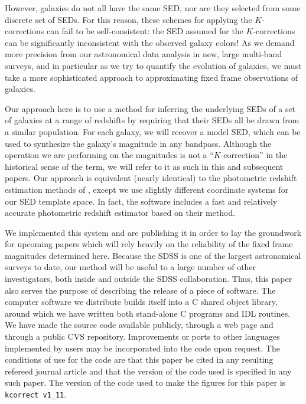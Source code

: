 \documentclass[10pt,preprint]{aastex}
\newcommand{\kversion}{{\tt v1\_11}}
\begin{document}
However, galaxies do not all have the same SED, nor are they selected
from some discrete set of SEDs. For this reason, these schemes for
applying the $K$-corrections can fail to be self-consistent: the SED
assumed for the $K$-corrections can be significantly inconsistent with
the observed galaxy colors! As we demand more precision from our
astronomical data analysis in new, large multi-band surveys, and in
particular as we try to quantify the evolution of galaxies, we must
take a more sophisticated approach to approximating fixed frame
observations of galaxies.

Our approach here is to use a method for inferring the underlying SEDs
of a set of galaxies at a range of redshifts by requiring that their
SEDs all be drawn from a similar population. For each galaxy, we will
recover a model SED, which can be used to synthesize the galaxy's
magnitude in any bandpass. Although the operation we are performing on
the magnitudes is not a ``$K$-correction'' in the historical sense of
the term, we will refer to it as such in this and subsequent
papers. Our approach is equivalent (nearly identical) to the
photometric redshift estimation methods of \citet{csabai00a},
except we use slightly different coordinate systems for our SED
template space. In fact, the software includes a fast and relatively
accurate photometric redshift estimator based on their method.

We implemented this system and are publishing it in order to lay the
groundwork for upcoming papers which will rely heavily on the
reliability of the fixed frame magnitudes determined here.  Because
the SDSS is one of the largest astronomical surveys to date, our
method will be useful to a large number of other investigators, both
inside and outside the SDSS collaboration.  Thus, this paper also
serves the purpose of describing the release of a piece of
software. The computer software we distribute builds itself into a C
shared object library, around which we have written both stand-alone C
programs and IDL routines. We have made the source code available
publicly, through a web page and through a public CVS
repository. Improvements or ports to other languages implemented by
users may be incorporated into the code upon request. The conditions
of use for the code are that this paper be cited in any resulting
refereed journal article and that the version of the code used is
specified in any such paper. The version of the code used to make the
figures for this paper is {\tt kcorrect \kversion}.
\end{document}
